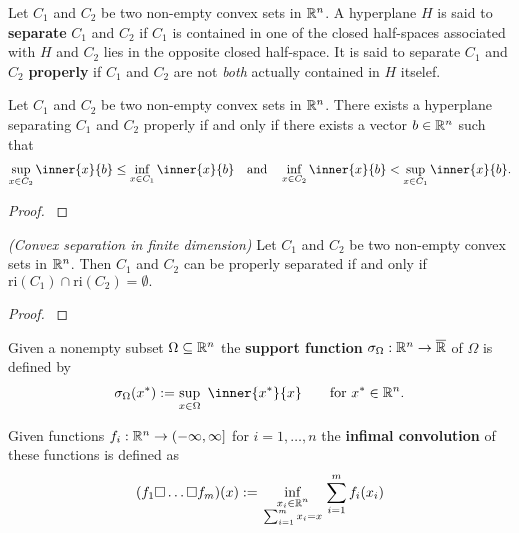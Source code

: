 \begin{definition}
  Let 
  $C_1$ and $C_2$
  be two non-empty convex sets in $\mathbb{R}^n$. 
  A hyperplane $H$ is said to \textbf{separate}
  $C_1$ and $C_2$
  if $C_1$ is contained in one of the closed half-spaces associated with
  $H$ and $C_2$ lies in the opposite closed half-space. It is said to separate 
  $C_1$ and $C_2$
  \textbf{properly} if 
  $C_1$ and $C_2$
  are not \textit{both} actually contained in $H$ itselef.
\end{definition}
\begin{theorem}
  Let $C_1$ and $C_2$ be two non-empty convex sets in $\mathbb{R}^n$. 
  There exists a hyperplane separating
  $C_1$ and $C_2$
  properly 
  if and only if
  there exists a vector $b\in \mathbb{R}^n$ such that
  \begin{gather}
    \sup_{x\in C_2} \inner{x}{b}
    \le
    \inf_{x\in C_1} \inner{x}{b}
    \quad 
    \text{and}
    \quad 
    \inf_{x\in C_2} \inner{x}{b}
    <
    \sup_{x\in C_1} \inner{x}{b}
    .
  \end{gather}
\end{theorem}
\begin{proof}
  \cite[Theorem~11.1]{Rockafellar1970}
\end{proof}
\begin{ftheorem}
  \emph{(Convex separation in finite dimension)}
  Let $C_1$ and $C_2$ be two non-empty convex sets in $\mathbb{R}^n$. 
  Then $C_1$ and $C_2$ can be properly separated if and only if 
  $\mathrm{ri}(C_1)\cap\mathrm{ri}(C_2)=\emptyset.$
\end{ftheorem}
\begin{proof}
  \cite[Theorem~11.3]{Rockafellar1970}
\end{proof}




\begin{definition}
  Given a nonempty subset 
  $\Omega \subseteq \mathbb{R}^n$
  the \textbf{support function} 
  $
  \sigma_\Omega : \mathbb{R}^n \to \overline{\mathbb{R}}
  $
  of $\Omega$
  is defined by
  \begin{gather}
    \sigma_\Omega
    (x^*)
    :=
    \sup_{x \in \Omega}
    \ 
    \inner{x^*}{x}
    \qquad
    \text{for}\ 
    x^* \in \R^n
    .
  \end{gather}
\end{definition}


\begin{definition}
  Given functions
  $
    f_i:
    \mathbb{R}^n \to (-\infty, \infty]
  $
  for $ i = 1, \ldots, n $
  the \textbf{infimal convolution} of these functions is defined as
  \begin{gather}
    (f_1 \square \ldots \square f_m)(x)
    :=
    \inf_{
    \begin{smallmatrix}
      x_i \in \mathbb{R}^n \\
      \sum_{i = 1}^{m} 
        x_i
      =
      x
    \end{smallmatrix}
    }
    \sum_{i = 1}^{m}
      f_i(x_i)
  \end{gather}
\end{definition}
 
